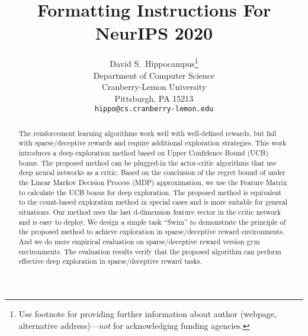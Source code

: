 \documentclass{article}
\title{Formatting Instructions For NeurIPS 2020}
\author{%
  David S.~Hippocampus\thanks{Use footnote for providing further information
    about author (webpage, alternative address)---\emph{not} for acknowledging
    funding agencies.} \\
  Department of Computer Science\\
  Cranberry-Lemon University\\
  Pittsburgh, PA 15213 \\
  \texttt{hippo@cs.cranberry-lemon.edu} \\
}
\begin{document}
\maketitle

\begin{abstract}
The reinforcement learning algorithms work well with well-defined rewards, but fail with sparse/deceptive rewards and require additional exploration strategies. This work introduces a deep exploration method based on Upper Confidence Bound (UCB) bonus. The proposed method can be plugged-in the actor-critic algorithms that use deep neural networks as a critic. Based on the conclusion of the regret bound of under the Linear Markov Decision Process (MDP) approximation, we use the Feature Matrix to calculate the UCB bonus for deep exploration. The proposed method is equivalent to the count-based exploration method in special cases and is more suitable for general situations. Our method uses the last d-dimension feature vector in the critic network and is easy to deploy. We design a simple task ``Swim'' to demonstrate the principle of the proposed method to achieve exploration in sparse/deceptive reward environments. And we do more empirical evaluation on sparse/deceptive reward version gym environments. The evaluation results verify that the proposed algorithm can perform effective deep exploration in sparse/deceptive reward tasks.
\end{abstract}











\end{document}
